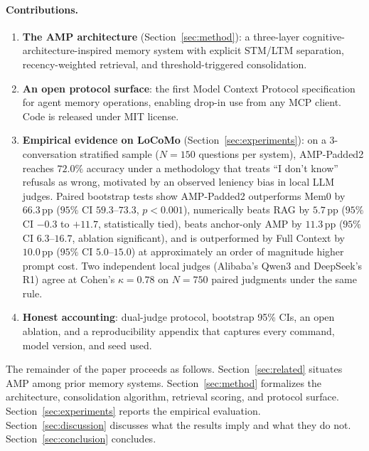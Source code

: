 \paragraph{Contributions.}
\begin{enumerate}
    \item \textbf{The AMP architecture} (Section~\ref{sec:method}): a three-layer cognitive-architecture-inspired memory system with explicit STM/LTM separation, recency-weighted retrieval, and threshold-triggered consolidation.
    \item \textbf{An open protocol surface}: the first Model Context Protocol specification for agent memory operations, enabling drop-in use from any MCP client. Code is released under MIT license.
    \item \textbf{Empirical evidence on LoCoMo} (Section~\ref{sec:experiments}): on a 3-conversation stratified sample ($N = 150$ questions per system), AMP-Padded2 reaches $72.0\%$ accuracy under a methodology that treats ``I don't know'' refusals as wrong, motivated by an observed leniency bias in local LLM judges. Paired bootstrap tests show AMP-Padded2 outperforms Mem0 by $66.3$\,pp ($95\%$ CI $59.3$--$73.3$, $p < 0.001$), numerically beats RAG by $5.7$\,pp ($95\%$ CI $-0.3$ to $+11.7$, statistically tied), beats anchor-only AMP by $11.3$\,pp ($95\%$ CI $6.3$--$16.7$, ablation significant), and is outperformed by Full Context by $10.0$\,pp ($95\%$ CI $5.0$--$15.0$) at approximately an order of magnitude higher prompt cost. Two independent local judges (Alibaba's Qwen3 and DeepSeek's R1) agree at Cohen's $\kappa = 0.78$ on $N = 750$ paired judgments under the same rule.
    \item \textbf{Honest accounting}: dual-judge protocol, bootstrap 95\% CIs, an open ablation, and a reproducibility appendix that captures every command, model version, and seed used.
\end{enumerate}

The remainder of the paper proceeds as follows. Section~\ref{sec:related} situates AMP among prior memory systems. Section~\ref{sec:method} formalizes the architecture, consolidation algorithm, retrieval scoring, and protocol surface. Section~\ref{sec:experiments} reports the empirical evaluation. Section~\ref{sec:discussion} discusses what the results imply and what they do not. Section~\ref{sec:conclusion} concludes.
